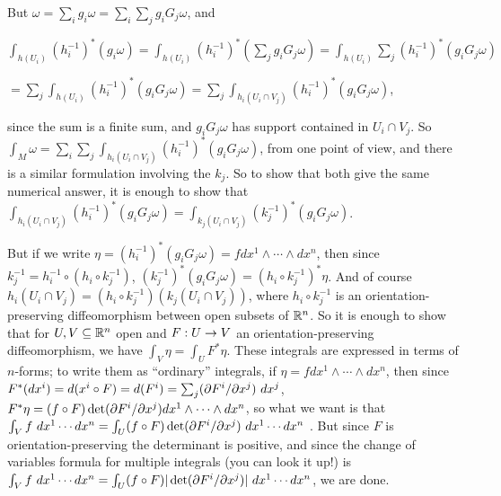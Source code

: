 
\noindent But $\omega=\sum_i g_i\omega=\sum_i\sum_jg_iG_j\omega$, and 

\noindent $\int_{h(U_i)}(h_i^{-1})^*(g_i\omega)=\int_{h(U_i)}(h_i^{-1})^*(\sum_jg_iG_j\omega)
=\int_{h(U_i)}\sum_j(h_i^{-1})^*(g_iG_j\omega)$

\hfill $=\sum_j\int_{h(U_i)}(h_i^{-1})^*(g_iG_j\omega)
=\sum_j\int_{h_i(U_i\cap V_j)}(h_i^{-1})^*(g_iG_j\omega)$, 

\noindent since the sum is a finite sum, and 
$g_iG_j\omega$ has support contained in $U_i\cap V_j$. So 
$\int_M\omega=\sum_i\sum_j\int_{h_i(U_i\cap V_j)}(h_i^{-1})^*(g_iG_j\omega)$, from one point of view, 
and there is a similar
formulation involving the $k_j$. So to show that both give the same numerical answer, it is enough to 
show that $\int_{h_i(U_i\cap V_j)}(h_i^{-1})^*(g_iG_j\omega)=\int_{k_j(U_i\cap V_j)}(k_j^{-1})^*(g_iG_j\omega)$.

But if we write $\eta=(h_i^{-1})^*(g_iG_j\omega)=f dx^1\wedge\cdots\wedge dx^n$, then
since $k_j^{-1}=h_i^{-1}\circ(h_i\circ k_j^{-1})$, $(k_j^{-1})^*(g_iG_j\omega)=(h_i\circ k_j^{-1})^*\eta$.
And of course $h_i(U_i\cap V_j)=(h_i\circ k_j^{-1})(k_j(U_i\cap V_j))$, where $h_i\circ k_j^{-1}$
is an orientation-preserving diffeomorphism between open subsets of ${\Bbb R}^n$. So it is enough to show that
for $U,V\subseteq{\Bbb R}^n$ open and $F:U\rightarrow V$ an orientation-preserving diffeomorphism,
we have $\int_V \eta=\int_U F^*\eta$. These integrals are expressed in terms of $n$-forms; to write them 
as ``ordinary'' integrals, if $\eta=fdx^1\wedge\cdots\wedge dx^n$, then since $F^*(dx^i)=d(x^i\circ F)=d(F^i)
=\sum_j (\partial F^i/\partial x^j)\ dx^j$, $F^*\eta=(f\circ F) \det(\partial F^i/\partial x^j)dx^1\wedge\cdots\wedge dx^n$,
so what we want is that 
$\int_V f\ dx^1\cdots dx^n=\int_U (f\circ F)\det(\partial F^i/\partial x^j)\ dx^1\cdots dx^n$ . But since $F$ is 
orientation-preserving the determinant is positive, and since the change of variables formula for multiple
integrals (you can look it up!) is
$\int_V f\ dx^1\cdots dx^n=\int_U (f\circ F)|\det(\partial F^i/\partial x^j)|\ dx^1\cdots dx^n$, we are done.

\msk

